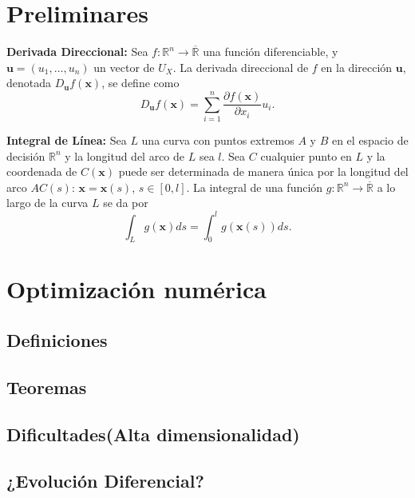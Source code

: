 
\chapter{Preliminares}

\textbf{Derivada Direccional:} Sea \( f : \mathbb{R}^n \to \overline{\mathbb{R}} \) una función diferenciable, y \( \mathbf{u} = (u_1, \ldots, u_n) \) un vector de \( U_X \). La derivada direccional de \( f \) en la dirección \( \mathbf{u} \), denotada \( D_{\mathbf{u}} f(\mathbf{x}) \), se define como
\[
D_{\mathbf{u}} f(\mathbf{x}) = \sum_{i=1}^{n} \frac{\partial f(\mathbf{x})}{\partial x_i} u_i.
\]

\textbf{Integral de Línea:} Sea \( L \) una curva con puntos extremos \( A \) y \( B \) en el espacio de decisión \( \mathbb{R}^n \) y la longitud del arco de \( L \) sea \( l \). Sea \( C \) cualquier punto en \( L \) y la coordenada de \( C (\mathbf{x}) \) puede ser determinada de manera única por la longitud del arco \( AC (s) \): \( \mathbf{x} = \mathbf{x}(s) \), \( s \in [0, l] \). La integral de una función \( g : \mathbb{R}^n \to \overline{\mathbb{R}} \) a lo largo de la curva \( L \) se da por
\begin{equation}
\int_L g(\mathbf{x}) ds = \int_0^l g(\mathbf{x}(s)) ds.
\label{EQ0}
\end{equation}

\chapter{Optimización numérica}

\section{Definiciones}

\section{Teoremas}

\section{Dificultades(Alta dimensionalidad)}

\section{¿Evolución Diferencial?}

